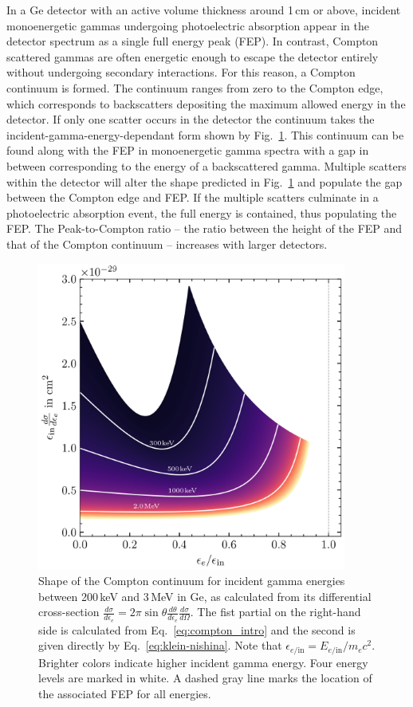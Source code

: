 In a Ge detector with an active volume thickness around 1\,cm or above, incident monoenergetic gammas undergoing photoelectric absorption appear in the detector spectrum as a single full energy peak (FEP). In contrast, Compton scattered gammas are often energetic enough to escape the detector entirely without undergoing secondary interactions. For this reason, a Compton continuum is formed. The continuum ranges from zero to the Compton edge, which corresponds to backscatters depositing the maximum allowed energy in the detector. If only one scatter occurs in the detector the continuum takes the incident-gamma-energy-dependant form shown by Fig.~\ref{fig:compton_shapes}. This continuum can be found along with the FEP in monoenergetic gamma spectra with a gap in between corresponding to the energy of a backscattered gamma. Multiple scatters within the detector will alter the shape predicted in Fig.~\ref{fig:compton_shapes} and populate the gap between the Compton edge and FEP. If the multiple scatters culminate in a photoelectric absorption event, the full energy is contained, thus populating the FEP. The Peak-to-Compton ratio -- the ratio between the height of the FEP and that of the Compton continuum -- increases with larger detectors. 
\begin{figure}[htb]
	\centering
	\includegraphics[width=4in]{figs/gammas/compton_shape_width_4in.png}
	\caption{Shape of the Compton continuum for incident gamma energies between 200\,keV and 3\,MeV in Ge, as calculated from its differential cross-section $\frac{d\sigma}{d\epsilon_e} = 2\pi\sin\theta\frac{d\theta}{d\epsilon_e}\frac{d\sigma}{d\Omega}$. The fist partial on the right-hand side is calculated from Eq.~\ref{eq:compton_intro} and the second is given directly by Eq.~\ref{eq:klein-nishina}. Note that $\epsilon_{e/\text{in}} = E_{e/\text{in}}/m_ec^2$. Brighter colors indicate higher incident gamma energy. Four energy levels are marked in white. A dashed gray line marks the location of the associated FEP for all energies.}
	\label{fig:compton_shapes}
\end{figure}

